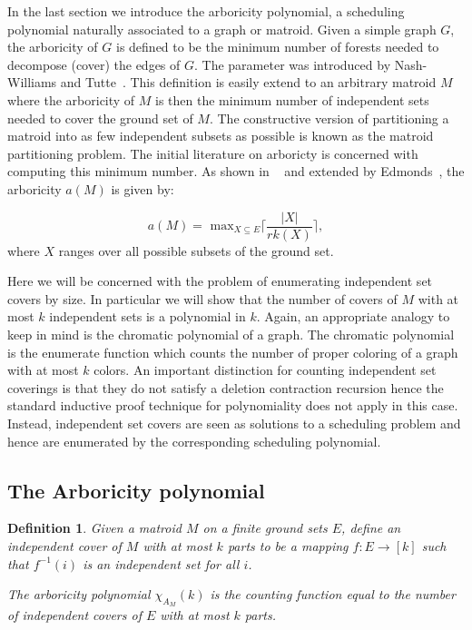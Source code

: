 \documentclass[12pt,reqno]{amsart}
\newtheorem{definition}{Definition}
\numberwithin{definition}{section}
\theoremstyle{definition}
\begin{document}
In the last section we introduce the arboricity polynomial, a
scheduling polynomial naturally associated to a graph or matroid.
Given a simple graph $G$, the arboricity of $G$ is defined to be the
minimum number of forests needed to decompose (cover) the edges of
$G$.  The parameter was introduced by Nash-Williams and Tutte~\cite{Nash, Tutte}.
This definition is easily extend to an arbitrary matroid $M$ where the
arboricity of $M$ is then the minimum number of independent sets needed to
cover the ground set of $M$.  The constructive version of partitioning
a matroid into as few independent subsets as possible is known as the
matroid partitioning problem. The initial
literature on arboricty is concerned with computing this minimum number.  As shown in 
~\cite{Nash, Tutte} and extended by Edmonds~\cite{Edmonds}, the arboricity $a(M)$ is given
by:

$$ a(M) = \textrm{ max}_{X\subseteq E} \lceil { \frac{|X|}{rk(X)}} \rceil, $$
where $X$ ranges over all possible subsets of the ground set.

Here we will be concerned with the problem of enumerating independent
set covers by size.  In particular we will show that the number of
covers of $M$ with at most $k$ independent sets is a polynomial in
$k$.  Again, an appropriate analogy to keep in mind is the chromatic
polynomial of a graph.  The chromatic polynomial is the enumerate
function which counts the number of proper coloring of a graph with at
most $k$ colors.  
 An important distinction for counting independent set coverings is
 that they do not satisfy a deletion contraction recursion hence the
 standard inductive proof technique for polynomiality does not apply in
 this case.  Instead, independent set covers are seen as solutions to
 a scheduling problem and hence are enumerated by the corresponding
 scheduling polynomial.


\subsection{The Arboricity polynomial}

\begin{definition} Given a matroid $M$ on a finite ground sets $E$, define an independent cover of $M$ with at most $k$ parts to be a mapping $f : E \rightarrow [k]$ such that $f^{-1}(i)$ is an independent set for all $i$.  

  The arboricity polynomial $\chi_{A_M}(k)$ is the counting function equal to the number of independent covers of $E$ with at most $k$ parts.
\end{definition}
\end{document}
